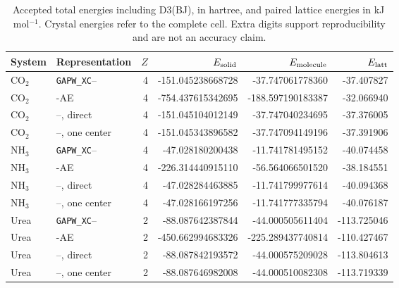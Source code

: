 \begin{table}[t]
\centering
\caption{Accepted total energies including D3(BJ), in hartree, and paired lattice energies in kJ\,mol$^{-1}$. Crystal energies refer to the complete cell. Extra digits support reproducibility and are not an accuracy claim.}
\label{tab:x23_total_si}
\begin{tabular}{llrrrr}
\toprule
System & Representation & $Z$ & $E_{\rm solid}$ & $E_{\rm molecule}$ & $E_{\rm latt}$ \\
\midrule
CO$_2$ & \texttt{GAPW\_XC}--\GTH{} & 4 & -151.045238668728 & -37.747061778360 & -37.407827 \\
CO$_2$ & \GAPW{}-AE & 4 & -754.437615342695 & -188.597190183387 & -32.066940 \\
CO$_2$ & \GAPW{}--\GTH{}, direct & 4 & -151.045104012149 & -37.747040234695 & -37.376005 \\
CO$_2$ & \GAPW{}--\GTH{}, one center & 4 & -151.045343896582 & -37.747094149196 & -37.391906 \\
NH$_3$ & \texttt{GAPW\_XC}--\GTH{} & 4 & -47.028180200438 & -11.741781495152 & -40.074458 \\
NH$_3$ & \GAPW{}-AE & 4 & -226.314440915110 & -56.564066501520 & -38.184551 \\
NH$_3$ & \GAPW{}--\GTH{}, direct & 4 & -47.028284463885 & -11.741799977614 & -40.094368 \\
NH$_3$ & \GAPW{}--\GTH{}, one center & 4 & -47.028166197256 & -11.741777335794 & -40.076187 \\
Urea & \texttt{GAPW\_XC}--\GTH{} & 2 & -88.087642387844 & -44.000505611404 & -113.725046 \\
Urea & \GAPW{}-AE & 2 & -450.662994683326 & -225.289437740814 & -110.427467 \\
Urea & \GAPW{}--\GTH{}, direct & 2 & -88.087842193572 & -44.000575209028 & -113.804613 \\
Urea & \GAPW{}--\GTH{}, one center & 2 & -88.087646982008 & -44.000510082308 & -113.719339 \\
\bottomrule
\end{tabular}
\end{table}

